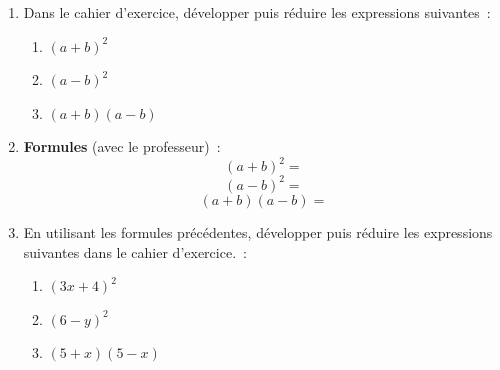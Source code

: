 \documentclass[activite]{thedocument}
\begin{document}
\begin{enumerate}
    \item Dans le cahier d'exercice, développer puis réduire les expressions suivantes~:
    \begin{enumerate}
        \item $(a+b)^2$
        \item $(a-b)^2$
        \item $(a+b)(a-b)$
    \end{enumerate}\vskip100pt
    \item {\bfseries Formules} (avec le professeur)~:
    $$(a+b)^2=$$\vskip5pt
    $$(a-b)^2=$$\vskip5pt
    $$(a+b)(a-b)=$$\vskip5pt
    \item En utilisant les formules précédentes, développer puis
    réduire les expressions suivantes dans le cahier d'exercice.~:
    \begin{enumerate}
        \item $(3x+4)^2$
        \item $(6-y)^2$
        \item $(5+x)(5-x)$
    \end{enumerate}
\end{enumerate}
\end{document}
